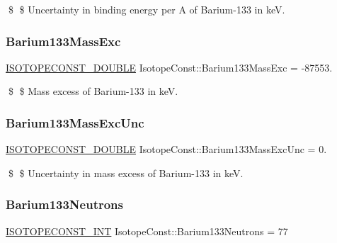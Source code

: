 \$ \$ Uncertainty in binding energy per A of Barium-\/133 in keV. \mbox{\label{group___isotope_const-_barium-_ba133_ga21409f1e2078695afe4258af3d0657db}} 
\subsubsection{\texorpdfstring{Barium133\+Mass\+Exc}{Barium133MassExc}}
{\footnotesize\ttfamily \mbox{\hyperlink{group___isotope_const-_macros_ga8f45a7272ce02c0b4c65c44636ed719a}{I\+S\+O\+T\+O\+P\+E\+C\+O\+N\+S\+T\+\_\+\+D\+O\+U\+B\+LE}} Isotope\+Const\+::\+Barium133\+Mass\+Exc = -\/87553.}

\$ \$ Mass excess of Barium-\/133 in keV. \mbox{\label{group___isotope_const-_barium-_ba133_ga7b00547140d8fb0587931d21cc3af1a2}} 
\subsubsection{\texorpdfstring{Barium133\+Mass\+Exc\+Unc}{Barium133MassExcUnc}}
{\footnotesize\ttfamily \mbox{\hyperlink{group___isotope_const-_macros_ga8f45a7272ce02c0b4c65c44636ed719a}{I\+S\+O\+T\+O\+P\+E\+C\+O\+N\+S\+T\+\_\+\+D\+O\+U\+B\+LE}} Isotope\+Const\+::\+Barium133\+Mass\+Exc\+Unc = 0.}

\$ \$ Uncertainty in mass excess of Barium-\/133 in keV. \mbox{\label{group___isotope_const-_barium-_ba133_ga91b82c9fd463be37d558cae0a3e64b0e}} 
\subsubsection{\texorpdfstring{Barium133\+Neutrons}{Barium133Neutrons}}
{\footnotesize\ttfamily \mbox{\hyperlink{group___isotope_const-_macros_ga5f18360b3e99483a35c32d789e62621c}{I\+S\+O\+T\+O\+P\+E\+C\+O\+N\+S\+T\+\_\+\+I\+NT}} Isotope\+Const\+::\+Barium133\+Neutrons = 77}

